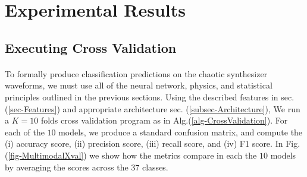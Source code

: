 \documentclass[12pt,letterpaper]{article}
\begin{document}

\newpage
\section{Experimental Results}
\label{sec-Results}

\subsection{Executing Cross Validation}

\paragraph*{}To formally produce classification predictions on the chaotic synthesizer waveforms, we must use all of the neural network, physics, and statistical principles outlined in the previous sections. Using the described features in sec. (\ref{sec-Features}) and appropriate architecture sec. (\ref{subsec-Architecture}), We run a $K=10$ folds cross validation program as in Alg.(\ref{alg-CrossValidation}). For each of the $10$ models, we produce a standard confusion matrix, and compute the (i) accuracy score, (ii) precision score, (iii) recall score, and (iv) F1 score. In Fig. (\ref{fig-MultimodalXval}) we show how the metrics compare in each the $10$ models by averaging the scores across the $37$ classes.
\end{document}
